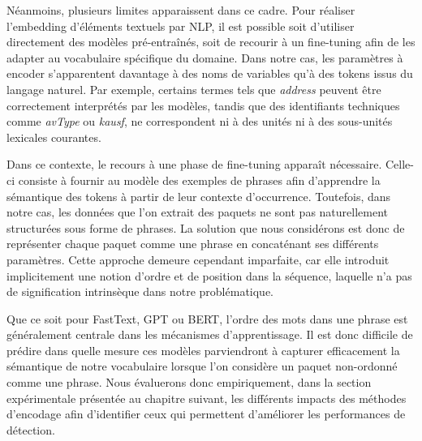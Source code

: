 \documentclass[a4paper,11pt,twoside]{StyleThese}
\begin{document}

Néanmoins, plusieurs limites apparaissent dans ce cadre. Pour réaliser l’embedding d’éléments textuels par NLP, il est possible soit d’utiliser directement des modèles pré-entraînés, soit de recourir à un fine-tuning afin de les adapter au vocabulaire spécifique du domaine. Dans notre cas, les paramètres à encoder s’apparentent davantage à des noms de variables qu’à des tokens issus du langage naturel. Par exemple, certains termes tels que \textit{address} peuvent être correctement interprétés par les modèles, tandis que des identifiants techniques comme \textit{avType} ou \textit{kausf}, ne correspondent ni à des unités ni à des sous-unités lexicales courantes.

Dans ce contexte, le recours à une phase de fine-tuning apparaît nécessaire. Celle-ci consiste à fournir au modèle des exemples de phrases afin d’apprendre la sémantique des tokens à partir de leur contexte d’occurrence. Toutefois, dans notre cas, les données que l'on extrait des paquets ne sont pas naturellement structurées sous forme de phrases. La solution que nous considérons est donc de représenter chaque paquet comme une phrase en concaténant ses différents paramètres. Cette approche demeure cependant imparfaite, car elle introduit implicitement une notion d’ordre et de position dans la séquence, laquelle n’a pas de signification intrinsèque dans notre problématique. 

Que ce soit pour FastText, GPT ou BERT, l'ordre des mots dans une phrase est généralement centrale dans les mécanismes d’apprentissage. Il est donc difficile de prédire dans quelle mesure ces modèles parviendront à capturer efficacement la sémantique de notre vocabulaire lorsque l'on considère un paquet non-ordonné comme une phrase. Nous évaluerons donc empiriquement, dans la section expérimentale présentée au chapitre suivant, les différents impacts des méthodes d'encodage afin d’identifier ceux qui permettent d’améliorer les performances de détection.
\end{document}
